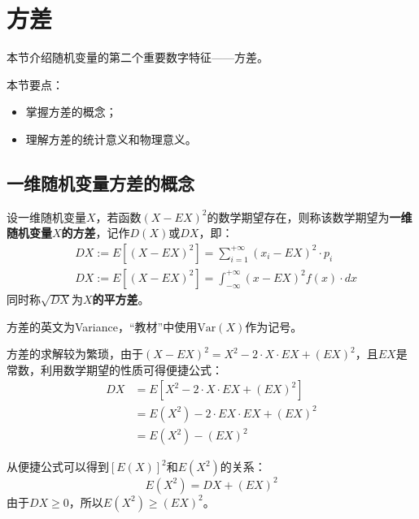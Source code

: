 \section{方差}

本节介绍随机变量的第二个重要数字特征——方差。

本节要点：
\begin{itemize}
    \item 掌握方差的概念；
    \item 理解方差的统计意义和物理意义。
\end{itemize}

\subsection{一维随机变量方差的概念}

\begin{definition}[一维随机变量的方差]
设一维随机变量$X$，若函数$\left( X-EX \right) ^2$的数学期望存在，则称该数学期望为{\bf 一维随机变量$X$的方差}，记作$D\left( X \right) $或$DX$，即：
\begin{align*}
&DX:=E\left[ \left( X-EX \right) ^2 \right] =\sum_{i=1}^{+\infty}{\left( x_i-EX \right) ^2\cdot p_i} \\
&DX:=E\left[ \left( X-EX \right) ^2 \right] =\int_{-\infty}^{+\infty}{\left( x-EX \right) ^2f\left( x \right) \cdot dx}
\end{align*}
同时称$\sqrt{DX}$为{\bf $X$的平方差}。
\end{definition}

\begin{tcolorbox}
方差的英文为Variance，“教材\cite{book2}”中使用$\mathrm{Var}\left( X \right) $作为记号。
\end{tcolorbox}

方差的求解较为繁琐，由于$\left( X-EX \right) ^2=X^2-2\cdot X\cdot EX+\left( EX \right) ^2$，且$EX$是常数，利用数学期望的性质可得便捷公式：
\begin{align*}
DX&=E\left[ X^2-2\cdot X\cdot EX+\left( EX \right) ^2 \right] \\
&=E\left( X^2 \right) -2\cdot EX\cdot EX+\left( EX \right) ^2 \\
&=E\left( X^2 \right) -\left( EX \right) ^2
\end{align*}

从便捷公式可以得到$\left[ E\left( X \right) \right] ^2$和$E\left( X^2 \right) $的关系：
\[
E\left( X^2 \right) =DX+\left( EX \right) ^2
\]
由于$DX\geqslant 0$，所以$E\left( X^2 \right) \geqslant \left( EX \right) ^2$。

